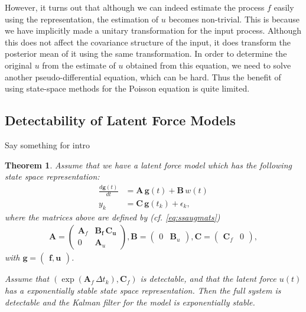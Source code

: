 \documentclass[journal]{IEEEtran}
\newtheorem{theorem}{Theorem}[section]
\newcommand{\simo}[1]{{\color{red}#1}}
\begin{document}
However, it turns out that although we can indeed estimate the process $f$ easily using the representation, the estimation of $u$ becomes non-trivial. This is because we have implicitly made a unitary transformation for the input process. Although this does not affect the covariance structure of the input, it does transform the posterior mean of it using the same transformation. In order to determine the original $u$ from the estimate of $u$ obtained from this equation, we need to solve another pseudo-differential equation, which can be hard. Thus the benefit of using state-space methods for the Poisson equation is quite limited. 

\subsection{Detectability of Latent Force Models}


\simo{Say something for intro}

\begin{theorem}
  Assume that we have a latent force model which has the following state space representation:
\begin{equation}
\begin{split}
  \frac{d\mathbf{g}(t)}{dt}
  &= \mathbf{A} \, \mathbf{g}(t)
  + \mathbf{B} \, w(t) \\
  y_k &= \mathbf{C} \, \mathbf{g}(t_k) + \epsilon_k,
\end{split}
\end{equation}
%
where the matrices above are defined by (cf. \eqref{eq:ssaugmats})
%
\begin{equation}
\begin{split}
  \mathbf{A}
  = \begin{pmatrix}
	\mathbf{A}_f & \mathbf{\mathbf{B}_f \, \mathbf{C}_u} \\
	0 & \mathbf{A}_u
  \end{pmatrix}, 
  \mathbf{B}
  = \begin{pmatrix}
	0 & \mathbf{B}_u
  \end{pmatrix}, 
  \mathbf{C}
  = \begin{pmatrix}
	\mathbf{C}_f & 0
  \end{pmatrix},
\end{split}
\end{equation}
%
with $\mathbf{g} = \begin{pmatrix} \mathbf{f}, \mathbf{u} \end{pmatrix}$. 

Assume that $(\exp(\mathbf{A}_f \, \Delta t_k),\mathbf{C}_f)$ is detectable, and that the latent force $u(t)$ has a exponentially stable state space representation. Then the full system is \emph{detectable} and the Kalman filter for the model is exponentially stable.
\end{theorem}
\end{document}
